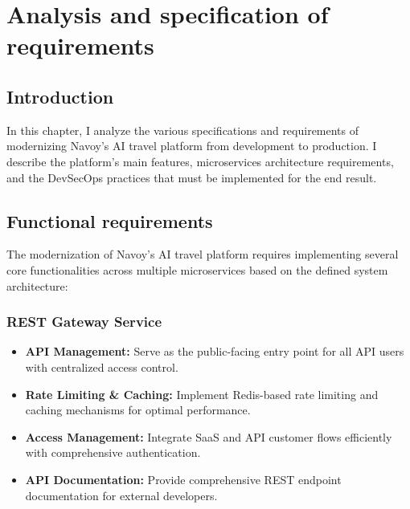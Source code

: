\chapter{Analysis and specification of requirements}
\minitoc
\newpage

\setcounter{secnumdepth}{0} %
\section{Introduction}
In this chapter, I analyze the various specifications and requirements of modernizing Navoy's AI travel platform from development to production.
I describe the platform's main features, microservices architecture requirements, and the DevSecOps practices that must be implemented for the end result.

\setcounter{secnumdepth}{2} %
\section{Functional requirements}
The modernization of Navoy's AI travel platform requires implementing several core functionalities across multiple microservices based on the defined system architecture:

\subsection{REST Gateway Service}
\begin{itemize}
    \item \textbf{API Management:} Serve as the public-facing entry point for all API users with centralized access control.
    \item \textbf{Rate Limiting \& Caching:} Implement Redis-based rate limiting and caching mechanisms for optimal performance.
    \item \textbf{Access Management:} Integrate SaaS and API customer flows efficiently with comprehensive authentication.
    \item \textbf{API Documentation:} Provide comprehensive REST endpoint documentation for external developers.
\end{itemize}

